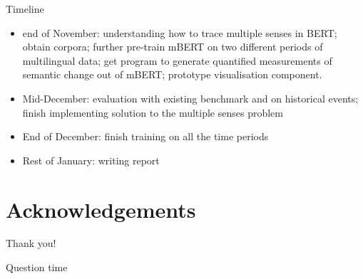\documentclass[10pt]{beamer}
\begin{document}
    

    
    

\begin{frame}{Timeline}
\begin{itemize}
    
    \item end of November: 
    understanding how to trace multiple senses in BERT; 
    obtain corpora; 
    further pre-train mBERT on two different periods of multilingual data; 
    get program to generate quantified measurements of semantic change out of mBERT;
    prototype visualisation component.
    
    \item Mid-December: 
    evaluation with existing benchmark and on historical events; 
    finish implementing solution to the multiple senses problem 
    
    \item End of December: finish training on all the time periods

    \item Rest of January: writing report


\end{itemize}
\end{frame}


%        
%        

\section*{Acknowledgements}  
\begin{frame}
    \textcolor{myNewColorA}{\huge{\centerline{Thank you!}}}
    \vspace*{0.5cm}

\textcolor{myNewColorA}{\Large{\centerline{Question time}}}

\end{frame}
\end{document}
